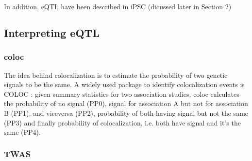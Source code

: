


In addition, eQTL have been described in iPSC (dicussed later in Section 2)

\subsection{Interpreting eQTL}

\subsubsection{coloc}
The idea behind colocalization is to estimate the probability of two genetic signals to be the same.
A widely used package to identify colocalization events is COLOC \cite{giambartolomei2014bayesian}: given summary statistics for two association studies, coloc calculates the probability of no signal (PP0), signal for association A but not for association B (PP1), and viceversa (PP2), probability of both having signal but not the same (PP3) and finally probability of colocalization, i.e. both have signal and it's the same (PP4).

\subsubsection{TWAS}





